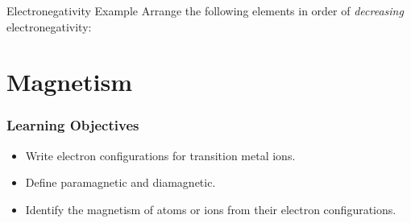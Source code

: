 \documentclass[notes=only]{beamer}
\begin{document}
\begin{frame}[t]{Electronegativity Example}
	Arrange the following elements in order of \emph{decreasing}
	electronegativity:

	\begin{center}
		 \qquad {} 
	\end{center}


\end{frame}

%	

\section{Magnetism}

\begin{frame}
	\frametitle{Learning Objectives}

	\begin{itemize}
		\item Write electron configurations for transition metal ions.
		\item Define paramagnetic and diamagnetic.
		\item Identify the magnetism of atoms or ions from their
			electron configurations.
	\end{itemize}
\end{frame}
\end{document}
